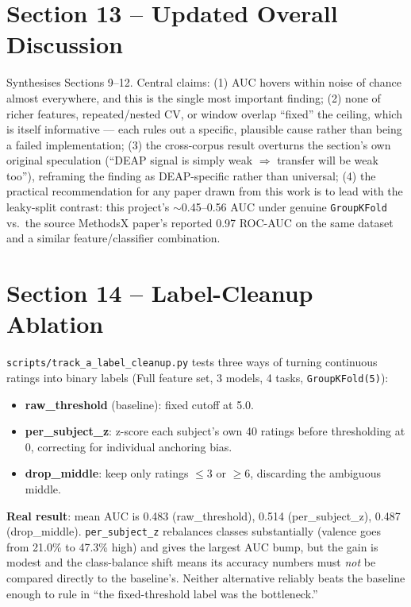 \documentclass[11pt]{report}
\begin{document}
\section{Section 13 -- Updated Overall Discussion}
\label{sec:s13}
Synthesises Sections 9--12. Central claims: (1) AUC hovers within noise of
chance almost everywhere, and this is the single most important finding;
(2) none of richer features, repeated/nested CV, or window overlap ``fixed''
the ceiling, which is itself informative --- each rules out a specific,
plausible cause rather than being a failed implementation; (3) the
cross-corpus result overturns the section's own original speculation (``DEAP
signal is simply weak $\Rightarrow$ transfer will be weak too''), reframing
the finding as DEAP-specific rather than universal; (4) the practical
recommendation for any paper drawn from this work is to lead with the
leaky-split contrast: this project's $\sim$0.45--0.56 AUC under genuine
\texttt{GroupKFold} vs.\ the source MethodsX paper's reported 0.97 ROC-AUC
on the same dataset and a similar feature/classifier combination.

\section{Section 14 -- Label-Cleanup Ablation}
\label{sec:s14}
\texttt{scripts/track\_a\_label\_cleanup.py} tests three ways of turning
continuous ratings into binary labels (Full feature set, 3 models, 4 tasks,
\texttt{GroupKFold(5)}):
\begin{itemize}
  \item \textbf{raw\_threshold} (baseline): fixed cutoff at 5.0.
  \item \textbf{per\_subject\_z}: z-score each subject's own 40 ratings
        before thresholding at 0, correcting for individual anchoring bias.
  \item \textbf{drop\_middle}: keep only ratings $\le3$ or $\ge6$, discarding
        the ambiguous middle.
\end{itemize}
\textbf{Real result}: mean AUC is 0.483 (raw\_threshold), 0.514
(per\_subject\_z), 0.487 (drop\_middle). \texttt{per\_subject\_z} rebalances
classes substantially (valence goes from 21.0\% to 47.3\% high) and gives
the largest AUC bump, but the gain is modest and the class-balance shift
means its accuracy numbers must \emph{not} be compared directly to the
baseline's. Neither alternative reliably beats the baseline enough to rule
in ``the fixed-threshold label was the bottleneck.''
\end{document}

